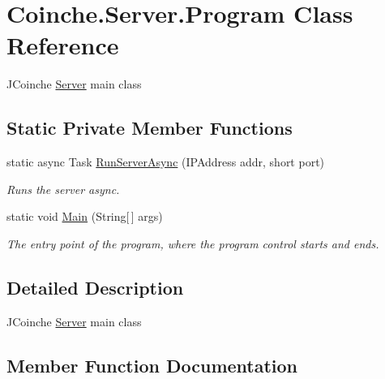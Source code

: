 \hypertarget{class_coinche_1_1_server_1_1_program}{}\section{Coinche.\+Server.\+Program Class Reference}
\label{class_coinche_1_1_server_1_1_program}


J\+Coinche \hyperlink{namespace_coinche_1_1_server}{Server} main class  


\subsection*{Static Private Member Functions}
\begin{DoxyCompactItemize}
\item 
static async Task \hyperlink{class_coinche_1_1_server_1_1_program_a376ce464c8f3725aa59134c9589a4ceb}{Run\+Server\+Async} (I\+P\+Address addr, short port)
\begin{DoxyCompactList}\small\item\em Runs the server async. \end{DoxyCompactList}\item 
static void \hyperlink{class_coinche_1_1_server_1_1_program_a48a23f5d3c3de01732d7f492c4e55e01}{Main} (String\mbox{[}$\,$\mbox{]} args)
\begin{DoxyCompactList}\small\item\em The entry point of the program, where the program control starts and ends. \end{DoxyCompactList}\end{DoxyCompactItemize}


\subsection{Detailed Description}
J\+Coinche \hyperlink{namespace_coinche_1_1_server}{Server} main class 



\subsection{Member Function Documentation}
\mbox{\label{class_coinche_1_1_server_1_1_program_a48a23f5d3c3de01732d7f492c4e55e01}} 
